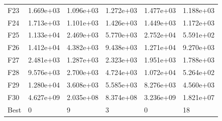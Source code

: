 \begin{tabular}{llllll}
F23  &  1.669e+03 &  1.096e+03 &  1.272e+03 &  1.477e+03 &  1.188e+03 \\
F24  &  1.713e+03 &  1.101e+03 &  1.426e+03 &  1.449e+03 &  1.172e+03 \\
F25  &  1.133e+04 &  2.469e+03 &  5.770e+03 &  2.752e+04 &  5.591e+02 \\
F26  &  1.412e+04 &  4.382e+03 &  9.438e+03 &  1.271e+04 &  9.270e+03 \\
F27  &  2.481e+03 &  1.287e+03 &  2.323e+03 &  1.951e+03 &  1.788e+03 \\
F28  &  9.576e+03 &  2.700e+03 &  4.724e+03 &  1.072e+04 &  5.264e+02 \\
F29  &  1.280e+04 &  3.608e+03 &  5.585e+03 &  8.276e+03 &  4.560e+03 \\
F30  &  4.627e+09 &  2.035e+08 &  8.374e+08 &  3.236e+09 &  1.821e+07 \\
Best &          0 &          9 &          3 &          0 &         18 \\
\bottomrule
\end{tabular}
